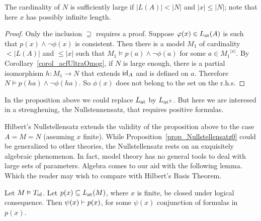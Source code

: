The cardinality of $N$ is sufficiently large if $|L(A)|<|N|$ and $|x|\le |N|$; note that here $x$ has possibly infinite length.

\begin{proof} 
  Only the inclusion $\supseteq$ requires a proof.
  Suppose $\phi(x)\in\atL(A)$ is such that $p(x)\wedge \neg\phi(x)$ is consistent.
  Then there is a model $M_1$ of cardinality $<|L(A)|$ and $\le |x|$ such that $M_1\models p(a)\wedge \neg\phi(a)$ for some $a\in {M_1}^{|x|}$.
  By Corollary~\ref{corol_acfUltraOmog}, if $N$ is large enough, there is a partial isomorphism $h:M_1\to N$ that extends $\id_A$ and is defined on $a$.
  Therefore $N\models p(ha)\wedge\neg\phi(ha)$.
  So $\phi(x)$ does not belong to the set on the r.h.s.
\end{proof}

In the proposition above we could replace $\atL$ by $\atpmL$.
But here we are interesed in a strenghening, the Nullstennensatz, that requires positive formulas.

Hilbert's Nullstellensatz extends the validity of the proposition above to the case $A=M=N$ (assuming $x$ finite). 
While Proposition~\ref{prop_Nullstellensatz0} could be generalized to other theories, the Nullstellensatz rests on an exquisitely algebraic phenomenon.
In fact, model theory has no general tools to deal with large sets of parameters.
Algebra comes to our aid with the following lemma.
Which the reader may wish to compare with Hilbert's Basis Theorem.

\begin{lemma}\label{lem_basisthm}
  Let $M\models T_{\rm id}$.
  Let $p(x)\subseteq\atL(M)$, where $x$ is finite, be closed under  logical consequence. 
  Then $\psi(x)\proves p(x)$, for some $\psi(x)$ conjunction of formulas in $p(x)$.
\end{lemma}

